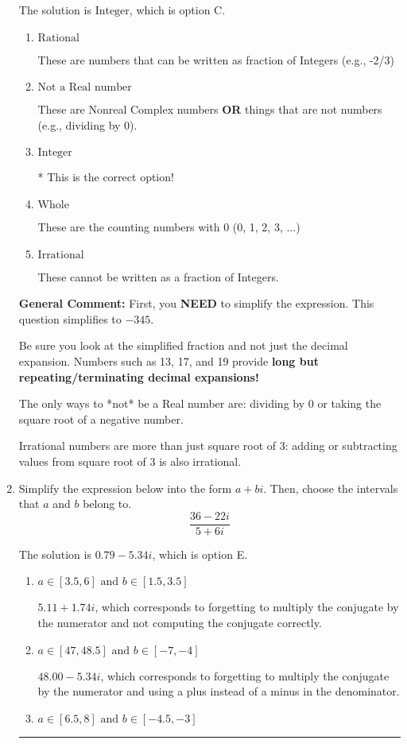 \documentclass{extbook}[14pt]
\newcommand{\litem}[1]{\item #1

\rule{\textwidth}{0.4pt}}
\begin{document}
\begin{enumerate}
{The solution is \( \text{Integer} \), which is option C.\begin{enumerate}[label=\Alph*.]
\item \( \text{Rational} \)

These are numbers that can be written as fraction of Integers (e.g., -2/3)
\item \( \text{Not a Real number} \)

These are Nonreal Complex numbers \textbf{OR} things that are not numbers (e.g., dividing by 0).
\item \( \text{Integer} \)

* This is the correct option!
\item \( \text{Whole} \)

These are the counting numbers with 0 (0, 1, 2, 3, ...)
\item \( \text{Irrational} \)

These cannot be written as a fraction of Integers.
\end{enumerate}

\textbf{General Comment:} First, you \textbf{NEED} to simplify the expression. This question simplifies to $-345$. 
 
 Be sure you look at the simplified fraction and not just the decimal expansion. Numbers such as 13, 17, and 19 provide \textbf{long but repeating/terminating decimal expansions!} 
 
 The only ways to *not* be a Real number are: dividing by 0 or taking the square root of a negative number. 
 
 Irrational numbers are more than just square root of 3: adding or subtracting values from square root of 3 is also irrational.
}
\litem{
Simplify the expression below into the form $a+bi$. Then, choose the intervals that $a$ and $b$ belong to.
\[ \frac{36 - 22 i}{5 + 6 i} \]

The solution is \( 0.79  - 5.34 i \), which is option E.\begin{enumerate}[label=\Alph*.]
\item \( a \in [3.5, 6] \text{ and } b \in [1.5, 3.5] \)

 $5.11  + 1.74 i$, which corresponds to forgetting to multiply the conjugate by the numerator and not computing the conjugate correctly.
\item \( a \in [47, 48.5] \text{ and } b \in [-7, -4] \)

 $48.00  - 5.34 i$, which corresponds to forgetting to multiply the conjugate by the numerator and using a plus instead of a minus in the denominator.
\item \( a \in [6.5, 8] \text{ and } b \in [-4.5, -3] \)


\end{enumerate}}
\end{enumerate}
\end{document}

